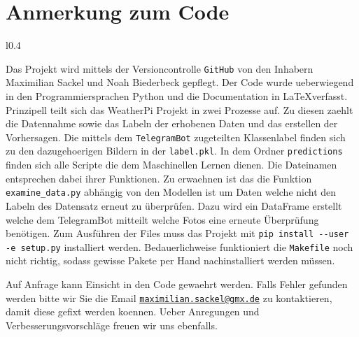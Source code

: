 \newpage
\section{Anmerkung zum Code}
\label{sec:06_code_anhang}
\begin{wrapfigure}{l}{0.4\textwidth}
\end{wrapfigure}
Das Projekt wird mittels der Versioncontrolle \texttt{GitHub} von den Inhabern
Maximilian Sackel
und Noah Biederbeck gepflegt. 
Der Code wurde ueberwiegend in den Programmiersprachen Python und die
Documentation in \LaTeX verfasst.
Prinzipell teilt sich das WeatherPi Projekt in zwei Prozesse auf. 
Zu diesen zaehlt die Datennahme sowie das Labeln der erhobenen Daten und das
erstellen der Vorhersagen.
Die mittels dem \texttt{TelegramBot} zugeteilten Klassenlabel finden sich zu den
dazugehoerigen Bildern in der \texttt{label.pkl}.
In dem Ordner \texttt{predictions} finden sich alle Scripte die dem Maschinellen
Lernen dienen.
Die Dateinamen entsprechen dabei ihrer Funktionen.
Zu erwaehnen ist das die Funktion \texttt{examine\_data.py} abhängig von den
Modellen ist um Daten welche nicht den Labeln des Datensatz erneut zu
überprüfen.
Dazu wird ein DataFrame erstellt welche dem TelegramBot mitteilt welche Fotos
eine erneute Überprüfung benötigen.
Zum Ausführen der Files muss das Projekt mit \verb|pip install --user -e setup.py| installiert werden. 
Bedauerlichweise funktioniert die \texttt{Makefile} noch nicht richtig, sodass
gewisse Pakete per Hand nachinstalliert werden müssen.


Auf Anfrage kann Einsicht in den Code gewaehrt werden.
Falls Fehler gefunden werden bitte wir Sie die Email
\href{mailto:maximilian.sackel@gmx.de}{\texttt{maximilian.sackel@gmx.de}} zu 
kontaktieren, damit diese gefixt werden koennen.
Ueber Anregungen und Verbesserungsvorschläge freuen wir uns ebenfalls.
